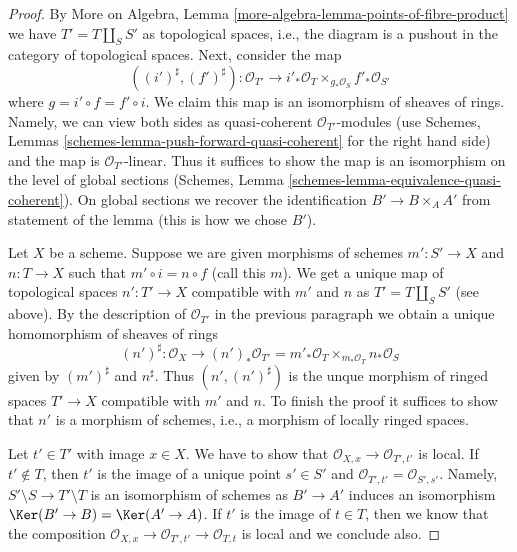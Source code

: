 \begin{proof}
By More on Algebra, Lemma \ref{more-algebra-lemma-points-of-fibre-product}
we have $T' = T \amalg_S S'$ as topological spaces, i.e., the diagram
is a pushout in the category of topological spaces. Next, consider
the map
$$
((i')^\sharp, (f')^\sharp) :
\mathcal{O}_{T'}
\longrightarrow
i'_*\mathcal{O}_T \times_{g_*\mathcal{O}_S} f'_*\mathcal{O}_{S'}
$$
where $g = i' \circ f = f' \circ i$. We claim this map is an isomorphism of
sheaves of rings. Namely, we can view both sides as quasi-coherent
$\mathcal{O}_{T'}$-modules (use
Schemes, Lemmas \ref{schemes-lemma-push-forward-quasi-coherent}
for the right hand side) and the map is $\mathcal{O}_{T'}$-linear.
Thus it suffices to show the map is an isomorphism on the level
of global sections
(Schemes, Lemma \ref{schemes-lemma-equivalence-quasi-coherent}).
On global sections we recover the identification
$B' \to B \times_A A'$ from statement of the lemma (this is
how we chose $B'$).

\medskip\noindent
Let $X$ be a scheme. Suppose we are given morphisms of schemes
$m' : S' \to X$ and $n : T \to X$ such that $m' \circ i = n \circ f$
(call this $m$). We get a unique map of topological spaces
$n' : T' \to X$ compatible with $m'$ and $n$ as
$T' = T \amalg_S S'$ (see above).
By the description of $\mathcal{O}_{T'}$ in the previous
paragraph we obtain a unique homomorphism of sheaves of rings
$$
(n')^\sharp :
\mathcal{O}_X
\longrightarrow
(n')_*\mathcal{O}_{T'} =
m'_*\mathcal{O}_T \times_{m_*\mathcal{O}_T} n_*\mathcal{O}_S
$$
given by $(m')^\sharp$ and $n^\sharp$.
Thus $(n', (n')^\sharp)$ is the unque morphism of
ringed spaces $T' \to X$ compatible with $m'$ and $n$.
To finish the proof it suffices to show that $n'$
is a morphism of schemes, i.e., a morphism of locally ringed spaces.

\medskip\noindent
Let $t' \in T'$ with image $x \in X$.
We have to show that $\mathcal{O}_{X, x} \to \mathcal{O}_{T', t'}$
is local. If $t' \not \in T$, then $t'$ is the image of a unique
point $s' \in S'$ and $\mathcal{O}_{T', t'} = \mathcal{O}_{S', s'}$.
Namely, $S' \setminus S \to T' \setminus T$ is an isomorphism of
schemes as $B' \to A'$ induces an isomorphism
$\Ker(B' \to B) = \Ker(A' \to A)$.
If $t'$ is the image of $t \in T$, then
we know that the composition
$\mathcal{O}_{X, x} \to \mathcal{O}_{T', t'} \to \mathcal{O}_{T, t}$
is local and we conclude also.
\end{proof}

